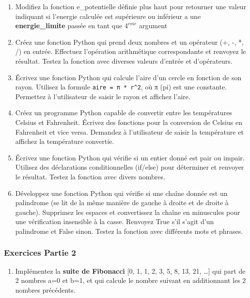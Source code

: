 \documentclass[11pt]{article}
\providecommand{\tightlist}{%
      \setlength{\itemsep}{0pt}\setlength{\parskip}{0pt}}
\begin{document}
\begin{enumerate}
\def\labelenumi{\arabic{enumi}.}
\item
  Modifiez la fonction e\_potentielle définie plus haut pour retourner
  une valeur indiquant si l'energie calculée est supérieure ou inférieur
  a une \textbf{energie\_limite} passée en tant que \(4^{eme}\) argument
\item
  Créez une fonction Python qui prend deux nombres et un opérateur (+,
  -, *, /) en entrée. Effectuez l'opération arithmétique correspondante
  et renvoyez le résultat. Testez la fonction avec diverses valeurs
  d'entrée et d'opérateurs.
\item
  Écrivez une fonction Python qui calcule l'aire d'un cercle en fonction
  de son rayon. Utilisez la formule \texttt{aire\ =\ π\ *\ r\^{}2}, où π
  (pi) est une constante. Permettez à l'utilisateur de saisir le rayon
  et affichez l'aire.
\item
  Créez un programme Python capable de convertir entre les températures
  Celsius et Fahrenheit. Écrivez des fonctions pour la conversion de
  Celsius en Fahrenheit et vice versa. Demandez à l'utilisateur de
  saisir la température et affichez la température convertie.
\item
  Écrivez une fonction Python qui vérifie si un entier donné est pair ou
  impair. Utilisez des déclarations conditionnelles (if/else) pour
  déterminer et renvoyer le résultat. Testez la fonction avec divers
  nombres.
\item
  Développez une fonction Python qui vérifie si une chaîne donnée est un
  palindrome (se lit de la même manière de gauche à droite et de droite
  à gauche). Supprimez les espaces et convertissez la chaîne en
  minuscules pour une vérification insensible à la casse. Renvoyez True
  s'il s'agit d'un palindrome et False sinon. Testez la fonction avec
  différents mots et phrases.
\end{enumerate}

\hypertarget{exercices-partie-2}{%
\subsubsection{Exercices Partie 2}\label{exercices-partie-2}}

\begin{enumerate}
\def\labelenumi{\arabic{enumi}.}
\tightlist
\item
  Implémentez la \textbf{suite de Fibonacci} {[}0, 1, 1, 2, 3, 5, 8, 13,
  21, \ldots{]} qui part de 2 nombres a=0 et b=1, et qui calcule le
  nombre suivant en additionnant les 2 nombres précédents.
\end{enumerate}
\end{document}
